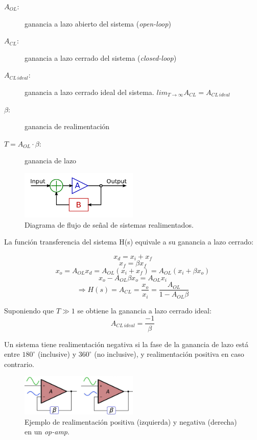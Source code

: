 \documentclass[../../main.tex]{subfiles}
\begin{document}
\begin{description}
	\item[$A_{OL}$:] ganancia a lazo abierto del sistema (\textit{open-loop})
	\item[$A_{CL}$:] ganancia a lazo cerrado del sistema (\textit{closed-loop})
	\item[$A_{CL\,ideal}$:] ganancia a lazo cerrado ideal del sistema. $lim_{T\rightarrow \infty}A_{CL} = A_{CL\,ideal}$
	\item[$\beta$:] ganancia de realimentaci\'on
	\item[$T=A_{OL}\cdot\beta$:] ganancia de lazo
\end{description}

\begin{figure}[htbp] %
	\centering
	\includegraphics[width=0.5\textwidth]{imagenes/Ideal_feedback_model.png}
	\caption{Diagrama de flujo de se\~nal de sistemas realimentados.}
	\label{fig:ej_3_realimentacion}
\end{figure}


La funci\'on transferencia del sistema H(s) equivale a su ganancia a lazo cerrado:

\[x_d = x_i+x_f\]
\[x_f = \beta x_f\]
\[x_o = A_{OL}x_d = A_{OL}\left( x_i+x_f \right) =  A_{OL}\left( x_i+\beta x_o \right)\]
\[x_o - A_{OL} \beta x_o = A_{OL} x_i\]
\begin{equation}
	\Rightarrow H(s) = A_{CL} = \frac{x_o}{x_i} = \frac{A_{OL}}{1-A_{OL}\beta}
	\label{eq:ej_3_ACL}
\end{equation}

Suponiendo que $T\gg 1$ se obtiene la ganancia a lazo cerrado ideal:
\begin{equation}
	A_{CL\,ideal} = \frac{-1}{\beta}
	\label{eq:ej_3_ACL_IDEAL}
\end{equation}

Un sistema tiene realimentaci\'on negativa si la fase de la ganancia de lazo est\'a entre $180^\circ$ (inclusive) y $360^\circ$ (no inclusive), y realimentaci\'on positiva en caso contrario.

\begin{figure}[htbp] %
	\centering
	\includegraphics[width=0.5\textwidth]{imagenes/pos_vs_neg_feedback.png}
	\caption{Ejemplo de realimentaci\'on positiva (izquierda) y negativa (derecha) en un \textit{op-amp}.}
	\label{fig:ej_3_realimentacion_pos_vs_neg_opamp}
\end{figure}
\end{document}
